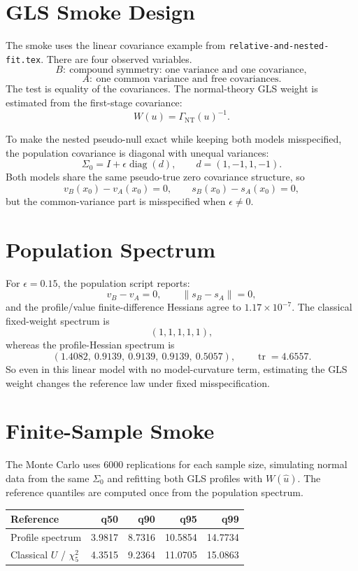 \documentclass[11pt]{article}
\newcommand{\tr}{\operatorname{tr}}
\begin{document}
\section{GLS Smoke Design}

The smoke uses the linear covariance example from
\texttt{relative-and-nested-fit.tex}. There are four observed variables.
\[
  B:\ \text{compound symmetry: one variance and one covariance},
\]
\[
  A:\ \text{one common variance and free covariances}.
\]
The test is equality of the covariances. The normal-theory GLS weight is
estimated from the first-stage covariance:
\[
  W(u)=\Gamma_{\mathrm{NT}}(u)^{-1}.
\]

To make the nested pseudo-null exact while keeping both models misspecified, the
population covariance is diagonal with unequal variances:
\[
  \Sigma_0=I+\epsilon\operatorname{diag}(d),
  \qquad
  d=(1,-1,1,-1).
\]
Both models share the same pseudo-true zero covariance structure, so
\[
  v_B(x_0)-v_A(x_0)=0,\qquad s_B(x_0)-s_A(x_0)=0,
\]
but the common-variance part is misspecified when $\epsilon\ne0$.

\section{Population Spectrum}

For $\epsilon=0.15$, the population script reports:
\[
  v_B-v_A=0,\qquad \lVert s_B-s_A\rVert=0,
\]
and the profile/value finite-difference Hessians agree to $1.17\times10^{-7}$.
The classical fixed-weight spectrum is
\[
  (1,1,1,1,1),
\]
whereas the profile-Hessian spectrum is
\[
  (1.4082,\ 0.9139,\ 0.9139,\ 0.9139,\ 0.5057),
  \qquad
  \tr=4.6557 .
\]
So even in this linear model with no model-curvature term, estimating the GLS
weight changes the reference law under fixed misspecification.

\section{Finite-Sample Smoke}

The Monte Carlo uses $6000$ replications for each sample size, simulating normal
data from the same $\Sigma_0$ and refitting both GLS profiles with $W(\hat u)$.
The reference quantiles are computed once from the population spectrum.

\begin{center}
\begin{tabular}{lrrrr}
\toprule
Reference & q50 & q90 & q95 & q99 \\
\midrule
Profile spectrum & 3.9817 & 8.7316 & 10.5854 & 14.7734 \\
Classical $U$ / $\chi^2_5$ & 4.3515 & 9.2364 & 11.0705 & 15.0863 \\
\bottomrule
\end{tabular}
\end{center}
\end{document}

